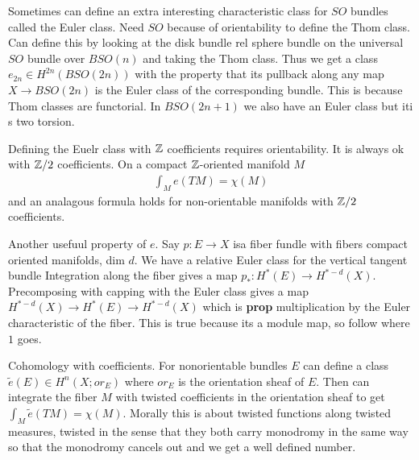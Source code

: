 \documentclass[12pt]{article}
\begin{document}
    \begin{remark}
        Sometimes can define an extra interesting characteristic class for $SO$ bundles called the Euler class. Need $SO$ because of orientability to define the Thom class. Can define this by looking at the disk bundle rel sphere bundle on the universal $SO$ bundle over $BSO(n)$ and taking the Thom class. Thus we get a class $e_{2n} \in H^{2n}(BSO(2n))$ with the property that its pullback along any map $X \to BSO(2n)$ is the Euler class of the corresponding bundle. This is because Thom classes are functorial. In $BSO(2n+1)$ we also have an Euler class but iti s two torsion. 
    \end{remark}

    \begin{remark}
        Defining the Euelr class with $\mathbb{Z}$ coefficients requires orientability. It is always ok with $\mathbb{Z}/2$ coefficients. On a compact $\mathbb{Z}$-oriented manifold $M$ \begin{align*}
        \int_M e(TM) = \chi(M)
        \end{align*} and an analagous formula holds for non-orientable manifolds with $\mathbb{Z}/2$ coefficients.
    \end{remark}

    \begin{remark}
        Another usefuul property of $e$. Say $p:E\to X$ isa fiber fundle with fibers compact oriented manifolds, dim $d$. We have a relative Euler class for the vertical tangent bundle Integration along the fiber gives a map $p_*: H^*(E) \to H^{*-d}(X)$. Precomposing with capping with the Euler class gives a map $H^{*-d}(X) \to H^*(E) \to H^{*-d}(X)$ which is \textbf{prop} multiplication by the Euler characteristic of the fiber. This is true because its a module map, so follow where $1$ goes.
        \end{remark}

        \begin{remark}
            Cohomology with coefficients. For nonorientable bundles $E$ can define a class $\tilde e(E) \in H^n(X; or_E)$ where $or_E$ is the orientation sheaf of $E$. Then can integrate the fiber $M$ with twisted coefficients in the orientation sheaf to get $\int_M \tilde e(TM) = \chi(M)$. Morally this is about twisted functions along twisted measures, twisted in the sense that they both carry monodromy in the same way so that the monodromy cancels out and we get a well defined number.
        \end{remark}
\end{document}
